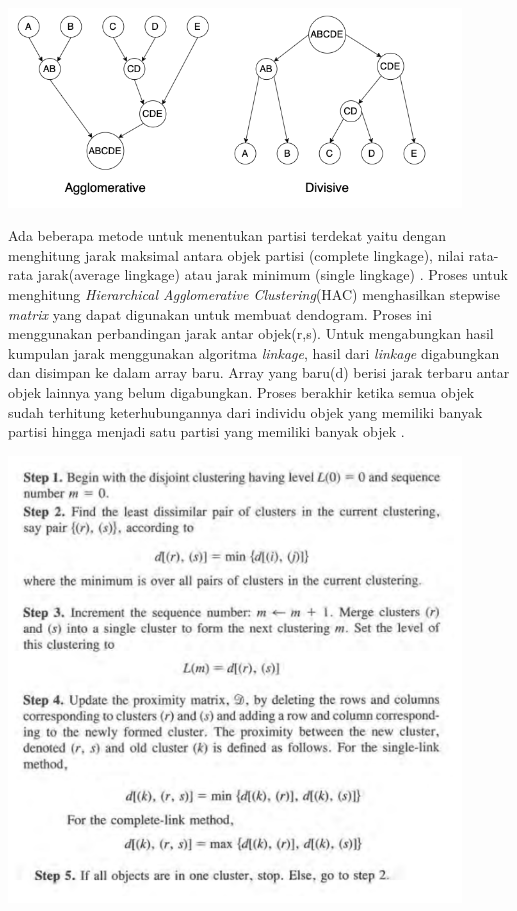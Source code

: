 \begin{enumerate}[leftmargin=1.3cm]
	\begin{center}
		\includegraphics[width=12cm]{img/bab_2/agVSDiv.png}
		\label{fig:asd}
	\end{center}

	Ada beberapa metode untuk menentukan partisi terdekat yaitu dengan menghitung jarak maksimal antara objek partisi (complete lingkage), nilai rata-rata jarak(average lingkage) atau jarak minimum (single lingkage) \cite{3D3}. Proses untuk menghitung \textit{Hierarchical Agglomerative Clustering}(HAC) menghasilkan stepwise \textit{matrix} yang dapat digunakan untuk membuat dendogram. Proses ini menggunakan perbandingan jarak antar objek(r,s). Untuk mengabungkan hasil kumpulan jarak menggunakan algoritma \textit{linkage}, hasil dari \textit{linkage} digabungkan dan disimpan ke dalam array baru. Array yang baru(d) berisi jarak terbaru antar objek lainnya yang belum digabungkan. Proses berakhir ketika semua objek sudah terhitung keterhubungannya dari individu objek yang memiliki banyak partisi hingga menjadi satu partisi yang memiliki banyak objek \cite{2C9}.
	
	\begin{center}
		\includegraphics[width=12cm]{img/bab_2/algo_hac.png}
		\label{fig:algo_hac}
	\end{center}


\end{enumerate}
